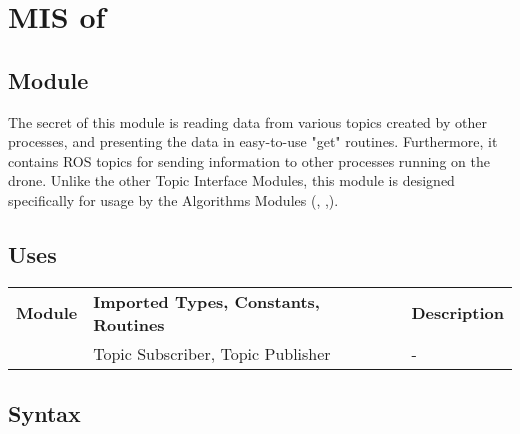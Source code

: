\documentclass[12pt, titlepage]{article}
\begin{document}
\section{MIS of } \label{MIS_ALGO_TI} 
\subsection{Module}
The secret of this module is reading data from various topics created by other processes, and presenting the data in easy-to-use "get" routines. Furthermore, it contains ROS topics for sending information to other processes running on the drone. Unlike the other Topic Interface Modules, this module is designed specifically for usage by the Algorithms Modules (, ,).
\subsection{Uses}
\begin{center}
\begin{tabular}{p{2 cm} p{5cm} p{6.5cm} } 
\hline
\textbf{Module} & \textbf{Imported Types, Constants, Routines} & \textbf{Description} \\
\nameref{ROS} & Topic Subscriber, Topic Publisher & - \\
\hline
\hline
\end{tabular}
\end{center}
\subsection{Syntax}
\end{document}
